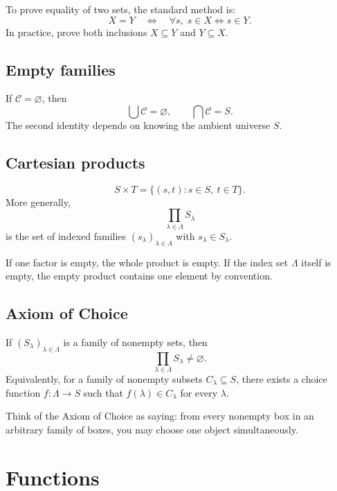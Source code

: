 \documentclass[11pt,a4paper]{article}
\begin{document}
\begin{exambox}
To prove equality of two sets, the standard method is:
\[
X=Y \quad\Longleftrightarrow\quad \forall s,\; s\in X \iff s\in Y.
\]
In practice, prove both inclusions $X\subseteq Y$ and $Y\subseteq X$.
\end{exambox}

\subsection{Empty families}
If $\mathcal C=\varnothing$, then
\[
\bigcup \mathcal C=\varnothing,
\qquad
\bigcap \mathcal C=S.
\]
The second identity depends on knowing the ambient universe $S$.

\subsection{Cartesian products}
\[
S\times T=\{(s,t):s\in S,\ t\in T\}.
\]
More generally,
\[
\prod_{\lambda\in\Lambda}S_\lambda
\]
is the set of indexed families $(s_\lambda)_{\lambda\in\Lambda}$ with $s_\lambda\in S_\lambda$.

\begin{trapbox}
If one factor is empty, the whole product is empty. If the index set $\Lambda$ itself is empty, the empty product contains one element by convention.
\end{trapbox}

\subsection{Axiom of Choice}
\begin{theorembox}
If $(S_\lambda)_{\lambda\in\Lambda}$ is a family of nonempty sets, then
\[
\prod_{\lambda\in\Lambda}S_\lambda\neq\varnothing.
\]
Equivalently, for a family of nonempty subsets $C_\lambda\subseteq S$, there exists a choice function $f:\Lambda\to S$ such that $f(\lambda)\in C_\lambda$ for every $\lambda$.
\end{theorembox}

\begin{keybox}
Think of the Axiom of Choice as saying: from every nonempty box in an arbitrary family of boxes, you may choose one object simultaneously.
\end{keybox}

\section{Functions}
\end{document}
